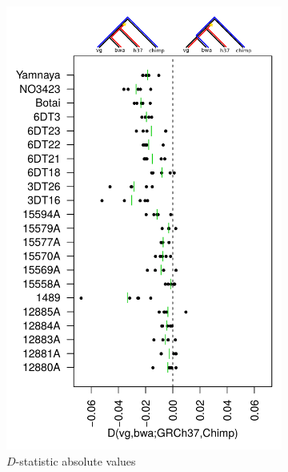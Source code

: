 \begin{figure}[htbp!]
  \centering
  \begin{subfigure}[t]{0.49\textwidth}
    \includegraphics[width=1.0\textwidth]{Chapter3/Figs/aDNA_d_stats_absolute.pdf}
    \caption{$D$-statistic absolute values}
    \label{subfig:aDNA_dstats_absolute}
  \end{subfigure}
  \begin{subfigure}[t]{0.49\textwidth}

\end{subfigure}
\end{figure}
